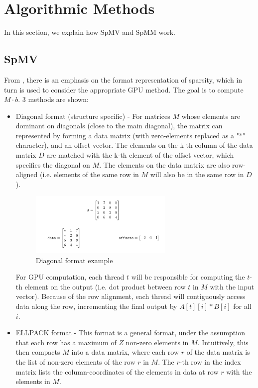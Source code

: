 \documentclass[12pt]{article}
\begin{document}
\section{Algorithmic Methods}
\hspace{0.5cm}In this section, we explain how SpMV and SpMM work.

\subsection{SpMV}
\hspace{0.5cm}From \cite{spmv_cuda}, there is an emphasis on the format representation of sparsity, which in turn is used to consider the appropriate GPU method. The goal is to compute $M \cdot b$. 3 methods are shown: 

\begin{itemize}
\item Diagonal format (structure specific) - For matrices $M$ whose elements are dominant on diagonals (close to the main diagonal), the matrix can represented by forming a data matrix (with zero-elements replaced as a "*" character), and an offset vector. The elements on the k-th column of the data matrix $D$ are matched with the k-th element of the offset vector, which specifies the diagonal on $M$. The elements on the data matrix are also row-aligned (i.e. elements of the same row in $M$ will also be in the same row in $D$). 

\begin{figure}[h]
  \caption{Diagonal format example}
  \centering 
  \includegraphics[width = 0.65\textwidth]{diagonal.png}
\end{figure}



\hspace{0.5cm}For GPU computation, each thread $t$ will be responsible for computing the $t$-th element on the output (i.e. dot product between row $t$ in $M$ with the input vector). Because of the row alignment, each thread will contiguously access data along the row, incrementing the final output by $ A[t][i]*B[i] $ for all $i$. 
\item ELLPACK format - This format is a general format, under the assumption that each row has a maximum of $Z$ non-zero elements in $M$. Intuitively, this then compacts $M$ into a data matrix, where each row $r$ of the data matrix is the list of non-zero elements of the row $r$ in $M$. The $r$-th row in the index matrix lists the column-coordinates of the elements in data at row $r$ with the elements in $M$. 



\end{itemize}
\end{document}
